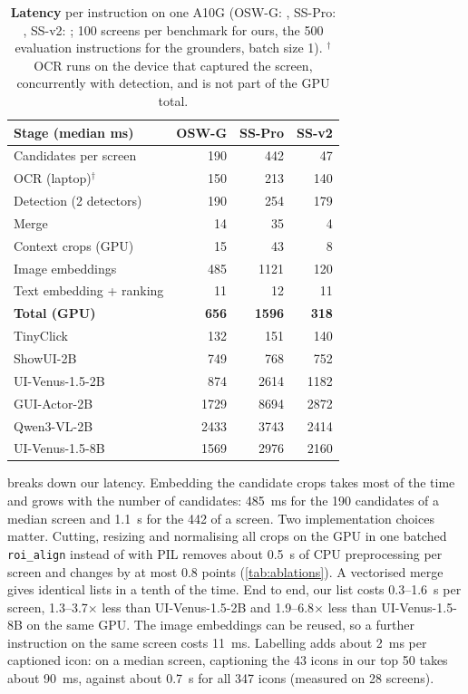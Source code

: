 \begin{table}[t]
\centering
\small
\setlength{\tabcolsep}{4pt}
\begin{tabular}{l rrr}
\toprule
Stage (median ms) & OSW-G & SS-Pro & SS-v2 \\
\midrule
Candidates per screen & 190 & 442 & 47 \\
OCR (laptop)$^\dagger$ & 150 & 213 & 140 \\
Detection (2 detectors) & 190 & 254 & 179 \\
Merge & 14 & 35 & 4 \\
Context crops (GPU) & 15 & 43 & 8 \\
Image embeddings & 485 & 1121 & 120 \\
Text embedding + ranking & 11 & 12 & 11 \\
\textbf{Total (GPU)} & \textbf{656} & \textbf{1596} & \textbf{318} \\
\midrule
TinyClick & 132 & 151 & 140 \\
ShowUI-2B & 749 & 768 & 752 \\
UI-Venus-1.5-2B & 874 & 2614 & 1182 \\
GUI-Actor-2B & 1729 & 8694 & 2872 \\
Qwen3-VL-2B & 2433 & 3743 & 2414 \\
UI-Venus-1.5-8B & 1569 & 2976 & 2160 \\
\bottomrule
\end{tabular}
\caption{\textbf{Latency} per instruction on one A10G (OSW-G: \osw, SS-Pro: \sspro, SS-v2: \ssv; 100 screens per benchmark for ours, the 500 evaluation
instructions for the grounders, batch size 1). $^\dagger$OCR runs on the device that captured the screen,
concurrently with detection, and is not part of the GPU total.}
\label{tab:speed}
\end{table}

 breaks down our latency. Embedding the candidate crops takes most of the time and grows with the
number of candidates: 485~ms for the 190 candidates of a median \osw screen and 1.1~s for the 442 of a \sspro
screen. Two implementation choices matter. Cutting, resizing and normalising all crops on the GPU in one batched
\texttt{roi\_align} instead of with PIL removes about 0.5~s of CPU preprocessing per \sspro screen and changes
 by at most 0.8 points (\cref{tab:ablations}). A vectorised merge gives identical lists in a tenth of the
time. End to end, our list costs 0.3--1.6~s per screen, 1.3--3.7$\times$ less than UI-Venus-1.5-2B and
1.9--6.8$\times$ less than UI-Venus-1.5-8B on the same GPU. The image embeddings can be reused, so a further
instruction on the same screen costs 11~ms. Labelling adds about 2~ms per captioned icon: on a median \sspro screen,
captioning the 43 icons in our top 50 takes about 90~ms, against about 0.7~s for all 347 icons (measured on 28
\sspro screens).

